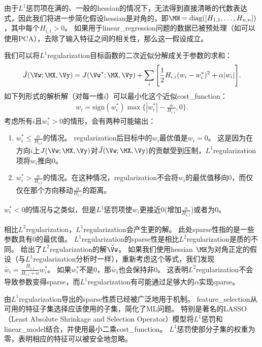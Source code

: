 由于$L^1$惩罚项在满的、一般的\gls{hessian}的情况下，无法得到直接清晰的代数表达式，因此我们将进一步简化假设\gls{hessian}是对角的，即$\MH = \text{diag}([H_{1,1},\dots, H_{n,n}])$，其中每个$H_{i,i}>0$。
如果用于\gls{linear_regression}问题的数据已被预处理（如可以使用PCA），去除了输入特征之间的相关性，那么这一假设成立。

我们可以将$L^1$\gls{regularization}目标函数的二次近似分解成关于参数的求和：
\begin{align}
 \hat J(\Vw; \MX, \Vy) = J(\Vw^*; \MX, \Vy) + \sum_i \Bigg [\frac{1}{2} H_{i,i} (w_i - w_i^*)^2 
 + \alpha |w_i| \Bigg].  %
\end{align}
如下列形式的解析解（对每一维$i$）可以最小化这个近似\gls{cost_function}：
\begin{align}
w_i = \text{sign}(w_i^*) \max\Big\{ |w_i^*| - \frac{\alpha}{H_{i,i}} , 0\Big\} .
\end{align}
考虑所有$i$且$w_i^* > 0$的情形，会有两种可能输出：
\begin{enumerate}
\item $w_i^* \leq \frac{\alpha}{H_{i,i}}$的情况。
\gls{regularization}后目标中的$w_i$最优值是$w_i = 0$。
这是因为在方向$i$上$J(\Vw; \MX, \Vy) $对$ \hat J(\Vw; \MX, \Vy)$的贡献受到压制，$L^1$\gls{regularization}项将$w_i$推向0。
\item  $w_i^* > \frac{\alpha}{H_{i,i}}$的情况。在这种情况，\gls{regularization}不会将$w_i$的最优值移向0，而仅仅在那个方向移动$\frac{\alpha}{H_{i,i}}$的距离。
\end{enumerate}
$w_i^* < 0$的情况与之类似，但是$L^1$惩罚项使$w_i$更接近0(增加$ \frac{\alpha}{H_{i,i}}$)或者为0。

相比$L^2$\gls{regularization}，$L^1$\gls{regularization}会产生更的解。
此处\gls{sparse}性指的是一些参数具有0的最优值。
$L^1$\gls{regularization}的\gls{sparse}性是相比$L^2$\gls{regularization}是质的不同。
给出了$L^2$\gls{regularization}的解$\tilde \Vw$。 
如果我们使用\gls{hessian} $\MH$为对角正定的假设（与$L^1$\gls{regularization}分析时一样），重新考虑这个等式，我们发现
$\tilde{w_i} = \frac{H_{i,i}}{H_{i,i} + \alpha} w_i^*$。
如果$w_i^*$不是0，那$\tilde{w_i}$也会保持非0。 
这表明$L^2$\gls{regularization}不会导致参数变得\gls{sparse}，而$L^1$\gls{regularization}有可能通过足够大的$\alpha$实现\gls{sparse}。
 
由$L^1$\gls{regularization}导出的\gls{sparse}性质已经被广泛地用于机制。
\gls{feature_selection}从可用的特征子集选择应该使用的子集，简化了\gls{ML}问题。
特别是著名的LASSO\citep{Tibshirani95}（Least Absolute Shrinkage and
Selection Operator）模型将$L^1$惩罚和\gls{linear_model}结合，并使用最小二乘\gls{cost_function}。 
$L^1$惩罚使部分子集的权重为零，表明相应的特征可以被安全地忽略。
 
